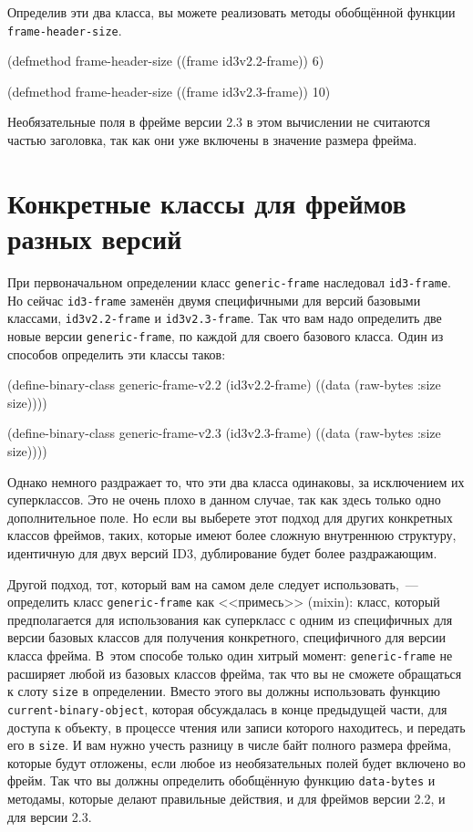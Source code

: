 Определив эти два класса, вы можете реализовать методы обобщённой функции
\lstinline{frame-header-size}.

\begin{myverb}
(defmethod frame-header-size ((frame id3v2.2-frame)) 6)

(defmethod frame-header-size ((frame id3v2.3-frame)) 10)
\end{myverb}

Необязательные поля в фрейме версии 2.3 в этом вычислении не считаются частью заголовка,
так как они уже включены в значение размера фрейма.

\section{Конкретные классы для фреймов разных версий}

При первоначальном определении класс \lstinline{generic-frame} наследовал \lstinline{id3-frame}. Но
сейчас \lstinline{id3-frame} заменён двумя специфичными для версий базовыми классами,
\lstinline{id3v2.2-frame} и \lstinline{id3v2.3-frame}. Так что вам надо определить две новые версии
\lstinline{generic-frame}, по каждой для своего базового класса. Один из способов определить
эти классы таков:

\begin{myverb}
(define-binary-class generic-frame-v2.2 (id3v2.2-frame)
  ((data (raw-bytes :size size))))

(define-binary-class generic-frame-v2.3 (id3v2.3-frame)
  ((data (raw-bytes :size size))))
\end{myverb}

Однако немного раздражает то, что эти два класса одинаковы, за исключением их
суперклассов. Это не очень плохо в данном случае, так как здесь только одно дополнительное
поле. Но если вы выберете этот подход для других конкретных классов фреймов, таких,
которые имеют более сложную внутреннюю структуру, идентичную для двух версий ID3,
дублирование будет более раздражающим.

Другой подход, тот, который вам на самом деле следует использовать,~--- определить класс
\lstinline{generic-frame} как <<примесь>> (mixin): класс, который предполагается для
использования как суперкласс с одним из специфичных для версии базовых классов для
получения конкретного, специфичного для версии класса фрейма. В~этом способе только один
хитрый момент: \lstinline{generic-frame} не расширяет любой из базовых классов фрейма, так что
вы не сможете обращаться к слоту \lstinline{size} в определении. Вместо этого вы должны
использовать функцию \lstinline{current-binary-object}, которая обсуждалась в конце предыдущей
части, для доступа к объекту, в процессе чтения или записи которого находитесь, и передать
его в \lstinline{size}. И вам нужно учесть разницу в числе байт полного размера фрейма, которые
будут отложены, если любое из необязательных полей будет включено во фрейм. Так что вы
должны определить обобщённую функцию \lstinline{data-bytes} и методамы, которые делают
правильные действия, и для фреймов версии 2.2, и для версии 2.3.


